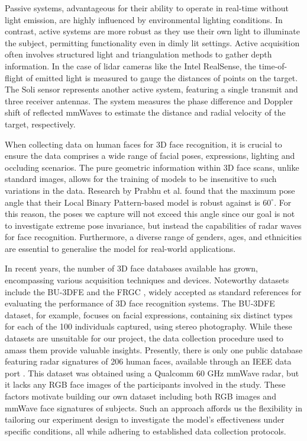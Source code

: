 \documentclass{interim}
\begin{document}
Passive systems, advantageous for their ability to operate in real-time without light emission, are highly influenced by environmental lighting conditions. In contrast, active systems are more robust as they use their own light to illuminate the subject, permitting functionality even in dimly lit settings. Active acquisition often involves structured light and triangulation methods to gather depth information. In the case of lidar cameras like the Intel RealSense, the time-of-flight of emitted light is measured to gauge the distances of points on the target. The Soli sensor represents another active system, featuring a single transmit and three receiver antennas. The system measures the phase difference and Doppler shift of reflected mmWaves to estimate the distance and radial velocity of the target, respectively. 

When collecting data on human faces for 3D face recognition, it is crucial to ensure the data comprises a wide range of facial poses, expressions, lighting and occluding scenarios. The pure geometric information within 3D face scans, unlike standard images, allows for the training of models to be insensitive to such variations in the data. Research by Prabhu et al. \cite{prabhu2011unconstrained} found that the maximum pose angle that their Local Binary Pattern-based model is robust against is $60^\circ$. For this reason, the poses we capture will not exceed this angle since our goal is not to investigate extreme pose invariance, but instead the capabilities of radar waves for face recognition. Furthermore, a diverse range of genders, ages, and ethnicities are essential to generalise the model for real-world applications.

In recent years, the number of 3D face databases available has grown, encompassing various acquisition techniques and devices. Noteworthy datasets include the BU-3DFE \cite{yin20063d} and the FRGC \cite{phillips2005overview}, widely accepted as standard references for evaluating the performance of 3D face recognition systems. The BU-3DFE dataset, for example, focuses on facial expressions, containing six distinct types for each of the 100 individuals captured, using stereo photography. While these datasets are unsuitable for our project, the data collection procedure used to amass them provide valuable insights. Presently, there is only one public database featuring radar signatures of 206 human faces, available through an IEEE data port \cite{mmwavefacedata}. This dataset was obtained using a Qualcomm 60 GHz mmWave radar, but it lacks any RGB face images of the participants involved in the study. These factors motivate building our own dataset including both RGB images and mmWave face signatures of subjects. Such an approach affords us the flexibility in tailoring our experiment design to investigate the model's effectiveness under specific conditions, all while adhering to established data collection protocols.
\end{document}

